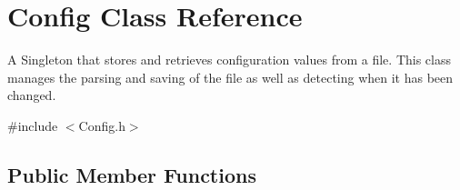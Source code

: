 \hypertarget{class_config}{
\section{\-Config \-Class \-Reference}
\label{class_config}
}


\-A \-Singleton that stores and retrieves configuration values from a file. \-This class manages the parsing and saving of the file as well as detecting when it has been changed.  




{\ttfamily \#include $<$\-Config.\-h$>$}

\subsection*{\-Public \-Member \-Functions}
